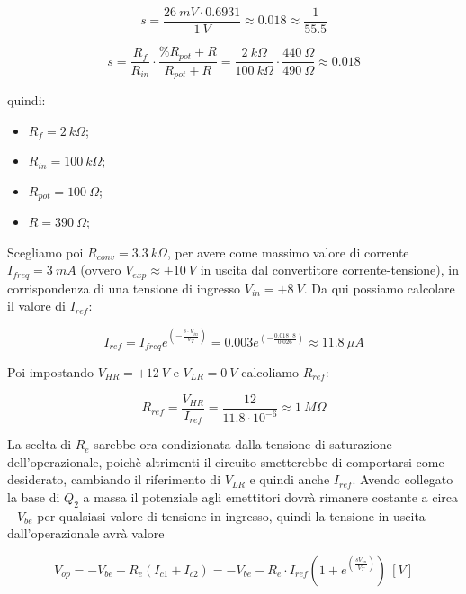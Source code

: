 \begin{equation}\label{s2}
    s=\frac{26\ mV\cdot 0.6931}{1\ V}\approx0.018\approx\frac{1}{55.5}
\end{equation}

\begin{equation}\label{s3}
    s=\frac{R_f}{R_{in}}\cdot\frac{\%R_{pot}+R}{R_{pot}+R}
    =\frac{2\ k\Omega}{100\ k\Omega}\cdot\frac{440\ \Omega}{490\ \Omega}
    \approx 0.018
\end{equation}

quindi:

\begin{itemize}
    \item $R_f = 2\ k\Omega$;
    \item $R_{in} = 100\ k\Omega$;
    \item $R_{pot} = 100\ \Omega$;
    \item $R = 390\ \Omega$;
\end{itemize}

Scegliamo poi $R_{conv}=3.3\ k\Omega$, per avere come massimo valore di corrente
$I_{freq} = 3\ mA$ (ovvero $V_{exp}\approx+10\ V$ in uscita dal convertitore corrente-tensione),
in corrispondenza di una tensione di ingresso $V_{in}=+8\ V$. Da qui possiamo calcolare il
valore di $I_{ref}$:

\begin{equation}\label{iref_calc}
    I_{ref}=I_{freq}e^{\left(-\frac{s\cdot V_{in}}{V_T}\right)}
    =0.003e^{\left(-\frac{0.018\cdot8}{0.026}\right)}
    \approx11.8\ \mu A
\end{equation}

Poi impostando $V_{HR}=+12\ V$ e $V_{LR}=0\ V$ calcoliamo $R_{ref}$:

\begin{equation}\label{rref_calc}
    R_{ref}=\frac{V_{HR}}{I_{ref}}=\frac{12}{11.8\cdot10^{-6}}\approx 1\ M\Omega
\end{equation}

La scelta di $R_e$ sarebbe ora condizionata dalla tensione di saturazione dell'operazionale,
poichè altrimenti il circuito smetterebbe di comportarsi come desiderato, cambiando il
riferimento di $V_{LR}$ e quindi anche $I_{ref}$. Avendo collegato la base di $Q_2$ a massa
il potenziale agli emettitori dovrà rimanere costante a circa $-V_{be}$ per qualsiasi valore
di tensione in ingresso, quindi la tensione in uscita dall'operazionale avrà valore

\begin{equation}
    V_{op}=-V_{be}-R_e(I_{c1}+I_{c2})=%
    -V_{be}-R_e\cdot I_{ref}\left(1+e^{\left(\frac{sV_{in}}{V_T}\right)}\right)\ [V]
\end{equation}

